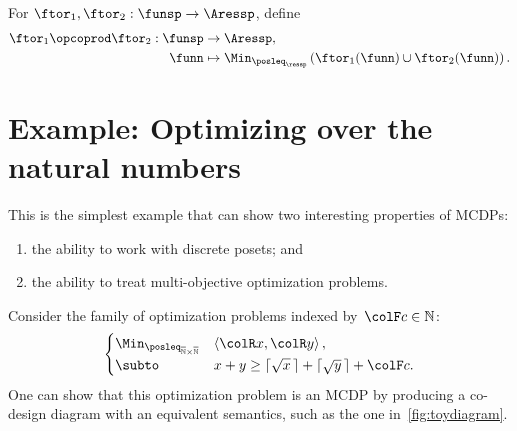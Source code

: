 \begin{definition}
\label{def:opcoprod}For $\ftor_{1},\ftor_{2}:\funsp\rightarrow\Aressp$,
define
\begin{align*}
\ftor_{1}\opcoprod\ftor_{2}:\funsp & \rightarrow\Aressp,\\
\funn& \mapsto\Min_{\posleq_{\ressp}}\left(\ftor_{1}(\funn)\cup\ftor_{2}(\funn)\right).
\end{align*}
\end{definition}


\section{Example: Optimizing over the natural numbers}

This is the simplest example that can show two interesting properties
of MCDPs:
\begin{enumerate}
\item the ability to work with discrete posets; and
\item the ability to treat multi-objective optimization problems.
\end{enumerate}
Consider the family of optimization problems indexed by~${\colF c}\in\mathbb{N}$:
\begin{equation}
\begin{cases}
\Min_{\posleq_{\overline{\mathbb{N}}\times\overline{\mathbb{N}}}} & \left\langle {\colR x},{\colR y}\right\rangle ,\\
\subto & x+y\geq\lceil\sqrt{x}\,\rceil+\lceil\sqrt{y}\,\rceil+{\colF c}.
\end{cases}\label{eq:example-1}
\end{equation}
One can show that this optimization problem is an MCDP by producing
a co-design diagram with an equivalent semantics, such as the one
in~\cref{fig:toydiagram}.

